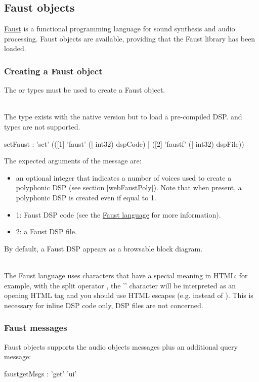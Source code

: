 \documentclass[a4paper,twoside]{article}
\newcommand{\sublevel}[1]	{\subsection{#1}}
\newcommand{\subsublevel}[1]	{\subsubsection{#1}}
\begin{document}
\sublevel{Faust objects}
\label{faustObjects}

\href{https://faust.grame.fr/}{Faust} is a functional programming language for sound synthesis and audio processing.
Faust objects are available, providing that the Faust library has been loaded.

\subsublevel{Creating a Faust object}
\label{webFaust}

The  or  types must be used to create a Faust object.

\note{}\\
The  type exists with the native version but to load a pre-compiled DSP.  and  types are not supported.

\begin{rail}
setFaust : 'set' (([1] 'faust' (| int32) dspCode)
				| ([2] 'faustf' (| int32) dspFile))

\end{rail}

The expected arguments of the  message are:
\begin{itemize}
\item an optional integer that indicates a number of voices used to create a polyphonic DSP (see section \ref{webFaustPoly}). Note that when present, a polyphonic DSP is created even if equal to 1.
\item 1: Faust DSP code (see the \href{https://faustdoc.grame.fr/}{Faust language} for more information).
\item 2: a Faust DSP file.
\end{itemize}

By default, a Faust DSP appears as a browsable block diagram.

\note{}\\
The Faust language uses characters that have a special meaning in HTML: for example, with the split operator \OSC{<:}, the '\OSC{<}' character will be interpreted as an opening HTML tag and you should use HTML escapes (e.g.  instead of \OSC{<}). This is necessary for inline DSP code only, DSP files are not concerned.

\subsublevel{Faust messages}
\label{webFaustMsgs}

Faust objects supports the audio objects messages plus an additional query message:

\begin{rail}
faustgetMsgs : 'get' 'ui'
\end{rail}
\end{document}
